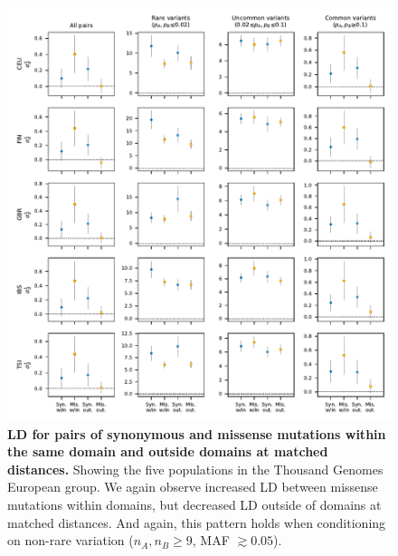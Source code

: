 \documentclass[]{article}
\begin{document}
\begin{figure}[ht!]
    \centering
    \includegraphics{../figures/data_domains_eur}
    \caption{
        \textbf{LD for pairs of synonymous and missense mutations within the
        same domain and outside domains at matched distances.}
        Showing the five populations in the Thousand Genomes European group.
        We again observe increased LD between missense mutations within domains,
        but decreased LD outside of domains at matched distances. And again,
        this pattern holds when conditioning on non-rare variation
        (\(n_A, n_B \geq 9\), MAF \(\gtrsim 0.05\)).
    }
    \label{fig:domainsEUR}
\end{figure}
\end{document}
